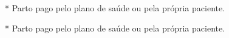 \documentclass{article}
\begin{document}



















* Parto pago pelo plano de saúde ou pela própria paciente.

* Parto pago pelo plano de saúde ou pela própria paciente.
\end{document}
